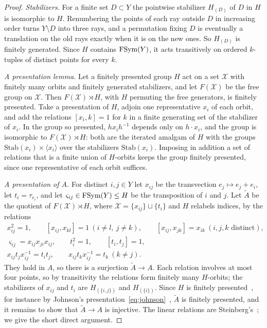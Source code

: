 \begin{proof}
\emph{Stabilizers.} For a finite set $D\subset Y$ the pointwise stabilizer $H_{(D)}$ of $D$ in $H$ is isomorphic to $H$. Renumbering the points of
each ray outside $D$ in increasing order turns $Y\setminus D$ into three rays, and a permutation fixing $D$ is eventually a translation on the
old rays exactly when it is on the new ones. So $H_{(D)}$ is finitely generated. Since $H$ contains $\operatorname{FSym}(Y)$, it acts transitively on ordered
$k$-tuples of distinct points for every $k$.

\emph{A presentation lemma.} Let a finitely presented group $H$ act on a set $\mathcal X$ with finitely many orbits and finitely generated
stabilizers, and let $F(\mathcal X)$ be the free group on $\mathcal X$. Then $F(\mathcal X)\rtimes H$, with $H$ permuting the free generators, is
finitely presented. Take a presentation of $H$, adjoin one representative $x_i$ of each orbit, and add the relations $[x_i,k]=1$ for $k$ in a
finite generating set of the stabilizer of $x_i$. In the group so presented, $hx_ih^{-1}$ depends only on $h\cdot x_i$, and the group is
isomorphic to $F(\mathcal X)\rtimes H$: both are the iterated amalgam of $H$ with the groups $\mathrm{Stab}(x_i)\times\langle x_i\rangle$ over
the stabilizers $\mathrm{Stab}(x_i)$. Imposing in addition a set of relations that is a finite union of $H$-orbits keeps the group finitely
presented, since one representative of each orbit suffices.

\emph{A presentation of $A$.} For distinct $i,j\in Y$ let $x_{ij}$ be the transvection $e_j\mapsto e_j+e_i$, let $t_i=\tau_{e_i}$, and let
$\varsigma_{ij}\in\operatorname{FSym}(Y)\le H$ be the transposition of $i$ and $j$. Let $\widetilde A$ be the quotient of $F(\mathcal X)\rtimes H$, where
$\mathcal X=\{x_{ij}\}\sqcup\{t_i\}$ and $H$ relabels indices, by the relations
\begin{gather*}
x_{ij}^2=1,\qquad [x_{ij},x_{kl}]=1\ (i\ne l,\ j\ne k),\qquad [x_{ij},x_{jk}]=x_{ik}\ (i,j,k\text{ distinct}),\\
\varsigma_{ij}=x_{ij}x_{ji}x_{ij},\qquad t_i^2=1,\qquad [t_i,t_j]=1,\\
x_{ij}t_jx_{ij}^{-1}=t_it_j,\qquad x_{ij}t_kx_{ij}^{-1}=t_k\ (k\ne j).
\end{gather*}
They hold in $A$, so there is a surjection $\widetilde A\to A$. Each relation involves at most four points, so by transitivity the relations form
finitely many $H$-orbits; the stabilizers of $x_{ij}$ and $t_i$ are $H_{(\{i,j\})}$ and $H_{(\{i\})}$. Since $H$ is finitely
presented~\cite{Brown1987}, for instance by Johnson's presentation~\eqref{eq:johnson}~\cite{Johnson1999}, $\widetilde A$ is finitely presented, and
it remains to show that $\widetilde A\to A$ is injective. The linear relations are Steinberg's~\cite{Milnor1971}; we give the short direct argument.


\end{proof}
